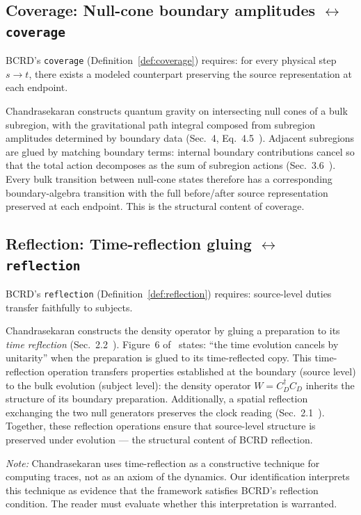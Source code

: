 \documentclass[11pt,a4paper]{article}
\theoremstyle{definition}
\theoremstyle{remark}
\begin{document}
\subsection{Coverage: Null-cone boundary amplitudes $\leftrightarrow$ \texttt{coverage}}

BCRD's \texttt{coverage} (Definition~\ref{def:coverage}) requires: for every physical step $s \to t$, there exists a modeled counterpart preserving the source representation at each endpoint.

Chandrasekaran constructs quantum gravity on intersecting null cones of a bulk subregion, with the gravitational path integral composed from subregion amplitudes determined by boundary data (Sec.~4, Eq.~4.5~\cite{chandrasekaran2026}). Adjacent subregions are glued by matching boundary terms: internal boundary contributions cancel so that the total action decomposes as the sum of subregion actions (Sec.~3.6~\cite{chandrasekaran2026}). Every bulk transition between null-cone states therefore has a corresponding boundary-algebra transition with the full before/after source representation preserved at each endpoint. This is the structural content of coverage.

\subsection{Reflection: Time-reflection gluing $\leftrightarrow$ \texttt{reflection}}

BCRD's \texttt{reflection} (Definition~\ref{def:reflection}) requires: source-level duties transfer faithfully to subjects.

Chandrasekaran constructs the density operator by gluing a preparation to its \emph{time reflection} (Sec.~2.2~\cite{chandrasekaran2026}). Figure~6 of~\cite{chandrasekaran2026} states: ``the time evolution cancels by unitarity'' when the preparation is glued to its time-reflected copy. This time-reflection operation transfers properties established at the boundary (source level) to the bulk evolution (subject level): the density operator $W = C_D^\dagger C_D$ inherits the structure of its boundary preparation. Additionally, a spatial reflection exchanging the two null generators preserves the clock reading (Sec.~2.1~\cite{chandrasekaran2026}). Together, these reflection operations ensure that source-level structure is preserved under evolution --- the structural content of BCRD reflection.

\emph{Note:} Chandrasekaran uses time-reflection as a constructive technique for computing traces, not as an axiom of the dynamics. Our identification interprets this technique as evidence that the framework satisfies BCRD's reflection condition. The reader must evaluate whether this interpretation is warranted.
\end{document}
